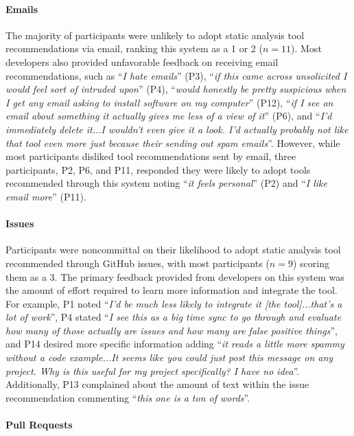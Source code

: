 \paragraph*{Emails}

The majority of participants were unlikely to adopt static analysis tool recommendations via email, ranking this system as a 1 or 2 ($n = 11$). Most developers also provided unfavorable feedback on receiving email recommendations, such as ``\textit{I hate emails}'' (P3), ``\textit{if this came across unsolicited I would feel sort of intruded upon}'' (P4), ``\textit{would honestly be pretty suspicious when I get any email asking to install software on my computer}'' (P12), ``\textit{if I see an email about something it actually gives me less of a view of it}'' (P6), and ``\textit{I'd immediately delete it...I wouldn't even give it a look. I'd actually probably not like that tool even more just because their sending out spam emails}''. However, while most participants disliked tool recommendations sent by email, three participants, P2, P6, and P11, responded they were likely to adopt tools recommended through this system noting ``\textit{it feels personal}'' (P2) and ``\textit{I like email more}'' (P11).

\paragraph*{Issues}

Participants were noncommittal on their likelihood to adopt static analysis tool recommended through GitHub issues, with most participants ($n = 9$) scoring them as a 3. The primary feedback provided from developers on this system was the amount of effort required to learn more information and integrate the tool. For example, P1 noted ``\textit{I'd be much less likely to integrate it [the tool]...that's a lot of work}'', P4 stated ``\textit{I see this as a big time sync to go through and evaluate how many of those actually are issues and how many are false positive things}'', and P14 desired more specific information adding ``\textit{it reads a little more spammy without a code example...It seems like you could just post this message on any project. Why is this useful for my project specifically? I have no idea}''. Additionally, P13 complained about the amount of text within the issue recommendation commenting ``\textit{this one is a ton of words}''.

\paragraph*{Pull Requests}

